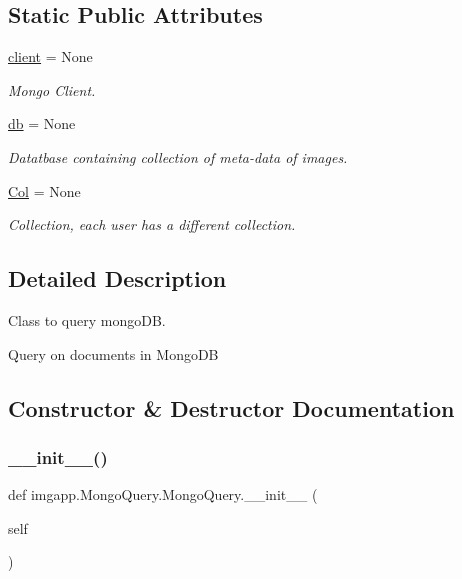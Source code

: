 \subsection*{Static Public Attributes}
\begin{DoxyCompactItemize}
\item 
\hyperlink{classimgapp_1_1MongoQuery_1_1MongoQuery_ac08e4d3a758a7b20da1310fda902f891}{client} = None
\begin{DoxyCompactList}\small\item\em Mongo Client. \end{DoxyCompactList}\item 
\hyperlink{classimgapp_1_1MongoQuery_1_1MongoQuery_a22e0b70674f81be47d79f0f80ae6fdc0}{db} = None
\begin{DoxyCompactList}\small\item\em Datatbase containing collection of meta-\/data of images. \end{DoxyCompactList}\item 
\hyperlink{classimgapp_1_1MongoQuery_1_1MongoQuery_a80083eaf7f9d97d3d243cd3cd8690b7e}{Col} = None
\begin{DoxyCompactList}\small\item\em Collection, each user has a different collection. \end{DoxyCompactList}\end{DoxyCompactItemize}


\subsection{Detailed Description}
Class to query mongo\+DB. 

Query on documents in Mongo\+DB 

\subsection{Constructor \& Destructor Documentation}
\mbox{\label{classimgapp_1_1MongoQuery_1_1MongoQuery_a693c49ebe9e0d1f143701902a90548e2}} 
\subsubsection{\texorpdfstring{\+\_\+\+\_\+init\+\_\+\+\_\+()}{\_\_init\_\_()}}
{\footnotesize\ttfamily def imgapp.\+Mongo\+Query.\+Mongo\+Query.\+\_\+\+\_\+init\+\_\+\+\_\+ (\begin{DoxyParamCaption}\item[{}]{self }\end{DoxyParamCaption})}



